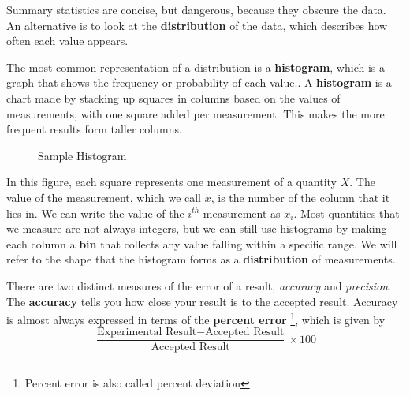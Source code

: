 Summary statistics are concise, but dangerous, because they obscure
the data.  An alternative is to look at the {\bf distribution} of the
data, which describes how often each value appears.

The most common representation of a distribution is a {\bf histogram},
which is a graph that shows the frequency or probability
of each value.. A {\bf histogram} is a chart made by stacking up squares in columns based on the values of measurements, with one square added per measurement. This makes the more frequent results form taller columns.

\begin{figure}[h]
\begin{center}
\caption{Sample Histogram}
\end{center}
\end{figure}

In this figure, each square represents one measurement of a quantity $X$. The value of the measurement, which we call $x$, is the number of the column that it lies in. We can write the value of the $i^{th}$ measurement as $x_i$. Most quantities that we measure are not always integers, but we can still use histograms by making each column a {\bf bin} that collects any value falling within a specific range. We will refer to the shape that the histogram forms as a {\bf distribution} of measurements. 

There are two distinct measures of the error of a result, {\it accuracy} and {\it precision}. The {\bf accuracy} tells you how close your result is to the accepted result. Accuracy is almost always expressed in terms of the {\bf percent error}
\footnote{Percent error is also called percent deviation}, which is given by 
\begin{equation}\frac{\textrm{Experimental Result} - \textrm{Accepted Result}}{\textrm{Accepted Result}} \times 100 \end{equation}

